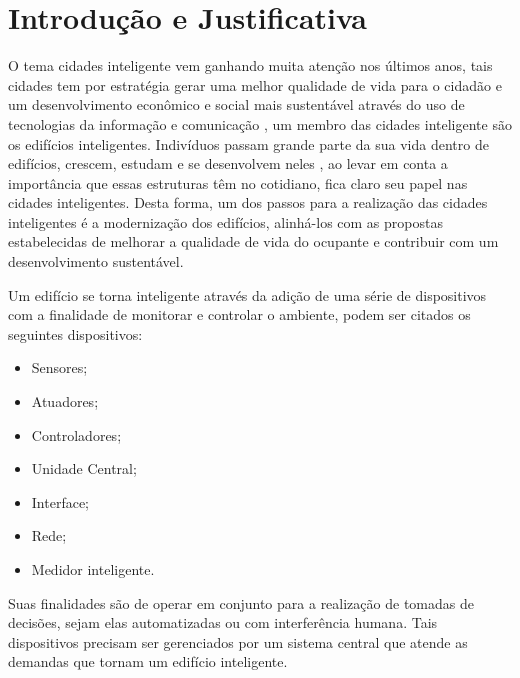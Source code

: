 \documentclass[
	12pt,				%
	a4paper,			%
	english,			%
	brazil,				%
	]{article}
\begin{document}
\section{Introdução e Justificativa}

O tema cidades inteligente vem ganhando muita atenção nos últimos anos, tais cidades tem por estratégia gerar uma melhor 
qualidade de vida para o cidadão e um desenvolvimento econômico e social mais sustentável através do uso de tecnologias da 
informação e comunicação \cite{cetic}, um membro das cidades inteligente são os edifícios inteligentes. Indivíduos passam grande 
parte da sua vida dentro de edifícios, crescem, estudam e se desenvolvem neles \cite{art1} \cite{noauthor_how_nodate}, ao levar 
em conta a importância que essas estruturas têm no cotidiano, fica claro seu papel nas cidades inteligentes. 
Desta forma, um dos passos para a realização das cidades inteligentes é a modernização dos edifícios, alinhá-los com as propostas
estabelecidas de melhorar a qualidade de vida do ocupante e contribuir com um desenvolvimento sustentável.

Um edifício se torna inteligente através da adição de uma série de dispositivos com a finalidade de monitorar e controlar o ambiente,
podem ser citados os seguintes dispositivos:
\begin{itemize}
    \item Sensores;
    \item Atuadores;
    \item Controladores;
    \item Unidade Central;
    \item Interface;
    \item Rede;
    \item Medidor inteligente.
\end{itemize}
\cite{Morvaj2011} Suas finalidades são de operar em conjunto para a realização de tomadas de decisões, sejam elas automatizadas ou 
com interferência humana.
Tais dispositivos precisam ser gerenciados por um sistema central que atende as demandas que tornam um edifício inteligente. 
\end{document}
